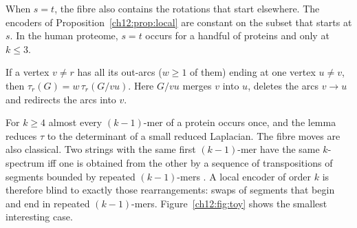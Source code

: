 When $s=t$, the fibre also contains the rotations that start elsewhere. The encoders of
Proposition~\ref{ch12:prop:local} are constant on the subset that starts at $s$. In the human proteome,
$s=t$ occurs for a handful of proteins and only at $k\le3$.

\begin{lemma}\label{ch12:lem:forced}
If a vertex $v\ne r$ has all its out-arcs ($w\ge1$ of them) ending at one vertex $u\ne v$, then
$\tau_r(G)=w\,\tau_r(G/vu)$. Here $G/vu$ merges $v$ into $u$, deletes the arcs $v\to u$ and redirects
the arcs into $v$.
\end{lemma}

For $k\ge4$ almost every $(k-1)$-mer of a protein occurs once, and the lemma reduces $\tau$ to the
determinant of a small reduced Laplacian. The fibre moves are also classical. Two strings with the
same first $(k-1)$-mer have the same $k$-spectrum iff one is obtained from the other by a sequence of
transpositions of segments bounded by repeated $(k-1)$-mers \cite{Ukk92,Pev95}. A local encoder of
order $k$ is therefore blind to exactly those rearrangements: swaps of segments that begin and end in
repeated $(k-1)$-mers. Figure~\ref{ch12:fig:toy} shows the smallest interesting case.

